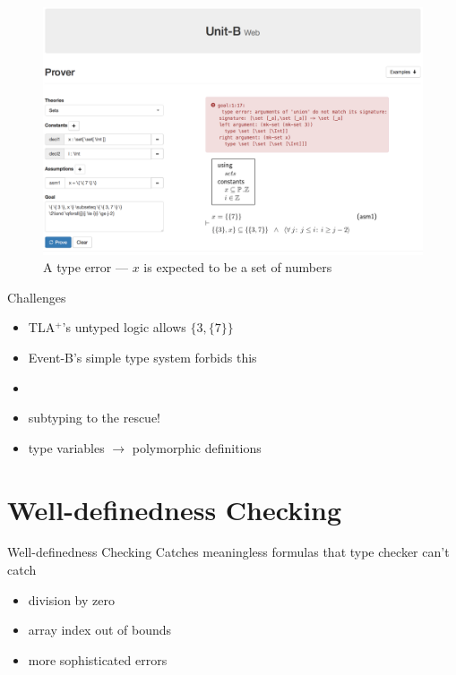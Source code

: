 \documentclass[10pt]{beamer}
\newcommand{\eventb}{Event-B\xspace}
\newcommand{\tla}{TLA${}^+$\xspace}
\begin{document}
\begin{frame}[plain]
  \begin{figure}
    \centering
    \includegraphics[width=\textwidth]{img/unitb_typechecking.png}
    \caption{A type error --- $x$ is expected to be a set of
      numbers}\label{fig:typechecking}
  \end{figure}
\end{frame}


\begin{frame}[fragile]{Challenges}
  \begin{itemize}[<+->]
  \item \tla's untyped logic allows $\{3, \{7\}\}$
  \item \eventb's simple type system forbids this
  \item {}
  \item \alert{subtyping} to the rescue!
  \item type variables $\rightarrow$ polymorphic definitions
  \end{itemize}
\end{frame}


\section{Well-definedness Checking}

\begin{frame}[fragile]{Well-definedness Checking}
  Catches meaningless formulas that type checker can't catch
  \begin{itemize}
  \item <2-> division by zero
  \item <3-> array index out of bounds
  \item <4-> more sophisticated errors
  \end{itemize}
\end{frame}
\end{document}
